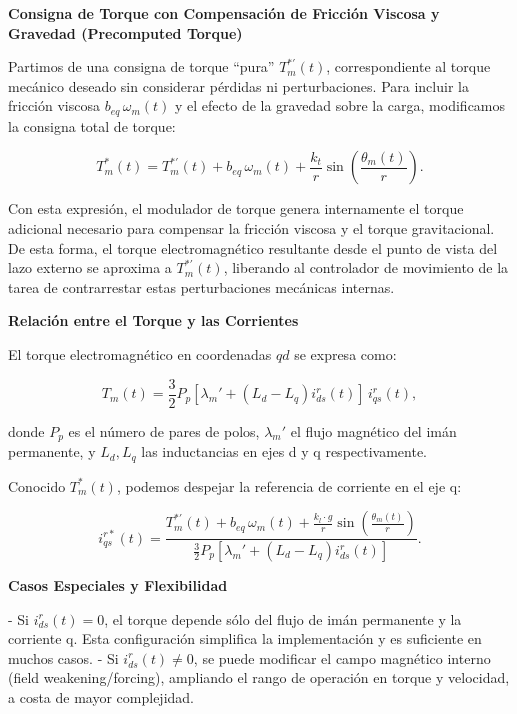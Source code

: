 \documentclass{article}
\begin{document}
\textbf{Consigna de Torque con Compensación de Fricción Viscosa y Gravedad (Precomputed Torque)}

Partimos de una consigna de torque “pura” \(T_m^{*'}(t)\), correspondiente al torque mecánico deseado sin considerar pérdidas ni perturbaciones. Para incluir la fricción viscosa \( b_{eq} \,\omega_m(t) \) y el efecto de la gravedad sobre la carga, modificamos la consigna total de torque:

\begin{equation}
T_m^{*}(t) = T_m^{*'}(t) + b_{eq}\,\omega_m(t) + \frac{k_t}{r}\sin\left(\frac{\theta_m(t)}{r}\right).
\end{equation}

Con esta expresión, el modulador de torque genera internamente el torque adicional necesario para compensar la fricción viscosa y el torque gravitacional. De esta forma, el torque electromagnético resultante desde el punto de vista del lazo externo se aproxima a \(T_m^{*'}(t)\), liberando al controlador de movimiento de la tarea de contrarrestar estas perturbaciones mecánicas internas.

\textbf{Relación entre el Torque y las Corrientes}

El torque electromagnético en coordenadas \( qd \) se expresa como:

\begin{equation}
T_m(t) = \frac{3}{2} P_p [ \lambda_m' + (L_d - L_q)i_{ds}^r(t) ]\, i_{qs}^r(t),
\end{equation}

donde \(P_p\) es el número de pares de polos, \(\lambda_m'\) el flujo magnético del imán permanente, y \(L_d, L_q\) las inductancias en ejes d y q respectivamente.

Conocido \(T_m^{*}(t)\), podemos despejar la referencia de corriente en el eje q:

\begin{equation}
i_{qs}^{r*}(t) = \frac{T_m^{*'}(t) + b_{eq}\,\omega_m(t) + \frac{k_l \cdot g}{r}\sin\left(\frac{\theta_m(t)}{r}\right)}{\frac{3}{2}P_p[\lambda_m' + (L_d - L_q)i_{ds}^r(t)]}.
\label{eq:Consigna_Corriente_Modulador_Torque}
\end{equation}

\textbf{Casos Especiales y Flexibilidad}

- Si \( i_{ds}^r(t)=0 \), el torque depende sólo del flujo de imán permanente y la corriente q. Esta configuración simplifica la implementación y es suficiente en muchos casos.  
- Si \( i_{ds}^r(t)\neq 0 \), se puede modificar el campo magnético interno (field weakening/forcing), ampliando el rango de operación en torque y velocidad, a costa de mayor complejidad.
\end{document}
